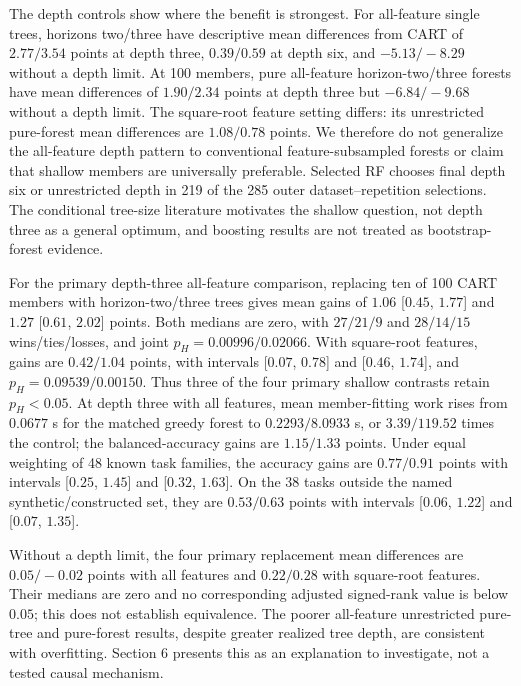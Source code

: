 \documentclass[11pt]{article}
\begin{document}
The depth controls show where the benefit is strongest. For all-feature
single trees, horizons two/three have descriptive mean differences from CART
of $2.77/3.54$ points at depth three, $0.39/0.59$ at depth six, and
$-5.13/-8.29$ without a depth limit. At 100 members, pure all-feature
horizon-two/three forests have mean differences of $1.90/2.34$ points
at depth three but $-6.84/-9.68$ without a depth limit. The square-root
feature setting differs: its unrestricted pure-forest mean differences
are $1.08/0.78$ points. We therefore do not generalize the all-feature
depth pattern to conventional feature-subsampled forests or claim that
shallow members are universally preferable. Selected RF chooses final
depth six or unrestricted depth in 219 of the 285 outer dataset--repetition
selections. The conditional
tree-size literature motivates the shallow question, not depth three as
a general optimum, and boosting results are not treated as bootstrap-forest
evidence.

For the primary depth-three all-feature comparison, replacing ten of 100
CART members with horizon-two/three trees gives mean gains of $1.06$
[$0.45$, $1.77$] and $1.27$ [$0.61$, $2.02$] points. Both medians
are zero, with $27/21/9$ and $28/14/15$ wins/ties/losses, and joint
$p_H=0.00996/0.02066$. With square-root features, gains are $0.42/1.04$
points, with intervals [$0.07$, $0.78$] and [$0.46$, $1.74$], and
$p_H=0.09539/0.00150$. Thus three of the four primary shallow contrasts
retain $p_H<0.05$. At depth three with all features, mean member-fitting
work rises from $0.0677$ s for the matched greedy forest to
$0.2293/8.0933$ s, or $3.39/119.52$ times the control; the
balanced-accuracy gains are $1.15/1.33$ points. Under equal weighting
of 48 known task families, the accuracy gains are $0.77/0.91$ points
with intervals [$0.25$, $1.45$] and [$0.32$, $1.63$]. On the 38 tasks
outside the named synthetic/constructed set, they are $0.53/0.63$
points with intervals [$0.06$, $1.22$] and [$0.07$, $1.35$].

Without a depth limit, the four primary replacement mean differences
are $0.05/-0.02$ points with all features and $0.22/0.28$ with
square-root features. Their medians are zero and no corresponding
adjusted signed-rank value is below $0.05$; this does not establish
equivalence. The poorer all-feature unrestricted pure-tree and pure-forest
results, despite greater realized tree depth, are consistent with
overfitting. Section 6 presents this as an explanation to investigate,
not a tested causal mechanism.
\end{document}
